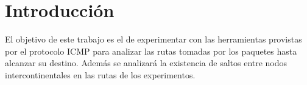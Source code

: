 \section{Introducción}

El objetivo de este trabajo es el de experimentar con las herramientas provistas por el protocolo ICMP para analizar las rutas tomadas por los paquetes hasta alcanzar su destino. Además se analizará la existencia de saltos entre nodos intercontinentales en las rutas de los experimentos.